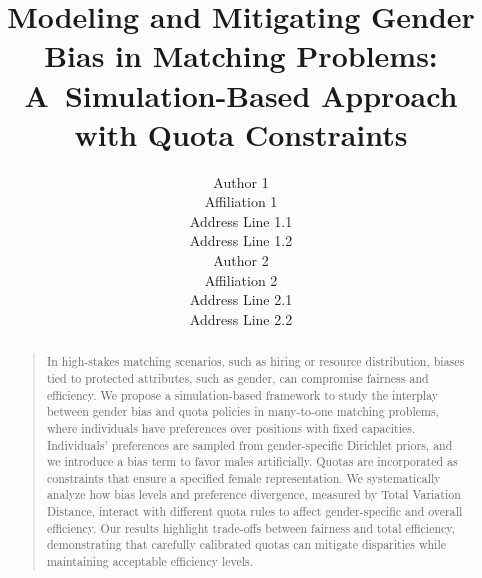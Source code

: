 \documentclass[letterpaper]{article}
\begin{document}
\title{Modeling and Mitigating Gender Bias in Matching Problems:\\ A~Simulation-Based Approach with Quota Constraints}
\author{Author 1\\
Affiliation 1\\
Address Line 1.1\\
Address Line 1.2\\
\And Author 2\\
Affiliation 2\\
Address Line 2.1\\
Address Line 2.2\\
}


\maketitle
\begin{abstract}
\begin{quote}
In high-stakes matching scenarios, such as hiring or resource distribution, biases tied to protected attributes, such as gender, can compromise fairness and efficiency. We propose a simulation-based framework to study the interplay between gender bias and quota policies in many-to-one matching problems, where individuals have preferences over positions with fixed capacities. Individuals' preferences are sampled from gender-specific Dirichlet priors, and we introduce a bias term to favor males artificially. Quotas are incorporated as constraints that ensure a specified female representation. We systematically analyze how bias levels and preference divergence, measured by Total Variation Distance, interact with different quota rules to affect gender-specific and overall efficiency. Our results highlight trade-offs between fairness and total efficiency, demonstrating that carefully calibrated quotas can mitigate disparities while maintaining acceptable efficiency levels. 
\end{quote}
\end{abstract}
\end{document}
